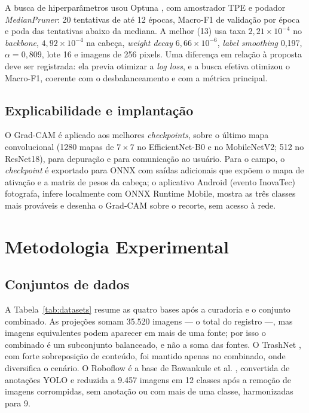 \documentclass[11pt,a4paper]{article}
\begin{document}
	A busca de hiperparâmetros usou Optuna \cite{akiba2019}, com amostrador TPE e podador \emph{MedianPruner}: 20 tentativas de até 12 épocas, Macro-F1 de validação por época e poda das tentativas abaixo da mediana. A melhor (13) usa taxa $2{,}21 \times 10^{-4}$ no \textit{backbone}, $4{,}92 \times 10^{-4}$ na cabeça, \textit{weight decay} $6{,}66 \times 10^{-6}$, \emph{label smoothing} 0,197, $\alpha = 0{,}809$, lote 16 e imagens de 256 pixels. Uma diferença em relação à proposta deve ser registrada: ela previa otimizar a \emph{log loss}, e a busca efetiva otimizou o Macro-F1, coerente com o desbalanceamento e com a métrica principal.
	
	\subsection{Explicabilidade e implantação}
	
	O Grad-CAM é aplicado aos melhores \emph{checkpoints}, sobre o último mapa convolucional (1280 mapas de $7\times7$ no EfficientNet-B0 e no MobileNetV2; 512 no ResNet18), para depuração e para comunicação ao usuário. Para o campo, o \emph{checkpoint} é exportado para ONNX com saídas adicionais que expõem o mapa de ativação e a matriz de pesos da cabeça; o aplicativo Android (evento InovaTec) fotografa, infere localmente com ONNX Runtime Mobile, mostra as três classes mais prováveis e desenha o Grad-CAM sobre o recorte, sem acesso à rede.
	
	\section{Metodologia Experimental}
	\label{sec:metodologia}
	
	\subsection{Conjuntos de dados}
	
	A Tabela~\ref{tab:datasets} resume as quatro bases após a curadoria e o conjunto combinado. As projeções somam 35.520 imagens --- o total do registro ---, mas imagens equivalentes podem aparecer em mais de uma fonte; por isso o combinado é um subconjunto balanceado, e não a soma das fontes. O TrashNet \cite{thung2016}, com forte sobreposição de conteúdo, foi mantido apenas no combinado, onde diversifica o cenário. O Roboflow \cite{roboflow_waste} é a base de Bawankule et al. \cite{bawankule2023}, convertida de anotações YOLO e reduzida a 9.457 imagens em 12 classes após a remoção de imagens corrompidas, sem anotação ou com mais de uma classe, harmonizadas para 9.
	
\end{document}
